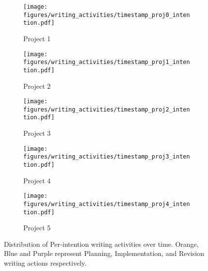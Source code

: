 \begin{figure*}
    \centering
    \begin{subfigure}{0.32\textwidth}
        \texttt{[image: figures/writing\_activities/timestamp\_proj0\_intention.pdf]}
        \caption{Project 1}
    \end{subfigure}
    \begin{subfigure}{0.32\textwidth}
        \texttt{[image: figures/writing\_activities/timestamp\_proj1\_intention.pdf]}
        \caption{Project 2}
    \end{subfigure}
    \begin{subfigure}{0.32\textwidth}
        \texttt{[image: figures/writing\_activities/timestamp\_proj2\_intention.pdf]}
        \caption{Project 3}
    \end{subfigure}
    \begin{subfigure}{0.32\textwidth}
        \texttt{[image: figures/writing\_activities/timestamp\_proj3\_intention.pdf]}
        \caption{Project 4}
    \end{subfigure}
    \begin{subfigure}{0.32\textwidth}
        \texttt{[image: figures/writing\_activities/timestamp\_proj4\_intention.pdf]}
        \caption{Project 5}
    \end{subfigure}
    \caption{Distribution of Per-intention writing activities over time. Orange, Blue and Purple represent Planning, Implementation, and Revision writing actions respectively.}
    \label{fig:writing-step-detailed-all}
\end{figure*}


